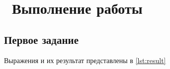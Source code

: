 \chapter{ Выполнение работы}
\label{cha:analysis}

\section{ Первое задание}

Выражения и их результат представлены в \ref{lst:result}

\begin{lstlisting}[style=lispStyle, caption={ Выражения и их результат},
                    label={lst:result}]
\end{lstlisting}

